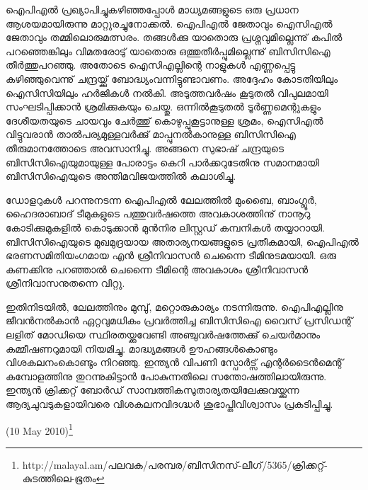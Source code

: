 

ഐപിഎല്‍ പ്രഖ്യാപിച്ചുകഴിഞ്ഞപ്പോള്‍ മാധ്യമങ്ങളുടെ ഒരു പ്രധാന ആശയമായിരുന്നു മാറ്റുരച്ചുനോക്കല്‍. ഐപിഎല്‍ 
ജേതാവും ഐസിഎല്‍ ജേതാവും തമ്മിലൊരുമത്സരം. തങ്ങള്‍ക്കു യാതൊരു പ്രശ്നവുമില്ലെന്നു് കപില്‍ പറഞ്ഞെങ്കിലും 
വിമതരോടു് യാതൊരു ഒത്തുതീര്‍പ്പുമില്ലെന്നു് ബിസിസിഐ തീര്‍ത്തുപറഞ്ഞു. അതോടെ ഐസിഎല്ലിന്റെ നാളുകള്‍ 
എണ്ണപ്പെട്ടു കഴിഞ്ഞുവെന്നു് ചന്ദ്രയ്ക്കു് ബോദ്ധ്യംവന്നിട്ടുണ്ടാവണം. അദ്ദേഹം കോടതിയിലും ഐസിസിയിലും ഹര്‍ജികള്‍ 
നല്‍കി. അടുത്തവര്‍ഷം കൂടുതല്‍ വിപുലമായി സംഘടിപ്പിക്കാന്‍ ശ്രമിക്കുകയും ചെയ്തു. ഒന്നില്‍കൂടുതല്‍ ടൂര്‍ണ്ണമെന്റുകളും 
ദേശീയതയുടെ ചായവും ചേര്‍ത്തു് കൊഴുപ്പുകൂട്ടാനുള്ള ശ്രമം, ഐസിഎല്‍ വിട്ടുവരാന്‍ താല്‍പര്യമുള്ളവര്‍ക്കു് മാപ്പുനല്‍കാനുള്ള 
ബിസിസിഐ തീരുമാനത്തോടെ അവസാനിച്ചു. അങ്ങനെ സുഭാഷ് ചന്ദ്രയുടെ ബിസിസിഐയുമായുള്ള 
പോരാട്ടം കെറി പാര്‍ക്കറുടേതിനു സമാനമായി ബിസിസിഐയുടെ അന്തിമവിജയത്തില്‍ കലാശിച്ചു.

ഡോളറുകള്‍ പറന്നുനടന്ന ഐപിഎല്‍ ലേലത്തില്‍ മുംബൈ, ബാംഗ്ലൂര്‍, ഹൈദരാബാദ് ടീമുകളുടെ പത്തുവര്‍ഷത്തെ 
അവകാശത്തിനു് നാനൂറു കോടിക്കുമുകളില്‍ കൊടുക്കാന്‍ മുന്‍നിര ലിസ്റ്റഡ് കമ്പനികള്‍ തയ്യാറായി. ബിസിസിഐയുടെ 
മുഖമുദ്രയായ അതാര്യനയങ്ങളുടെ പ്രതീകമായി, ഐപിഎല്‍ ഭരണസമിതിയംഗമായ എന്‍ ശ്രീനിവാസന്‍ ചെന്നൈ 
ടീമിനുടമയായി. ഒരു കണക്കിനു പറഞ്ഞാല്‍ ചെന്നൈ ടീമിന്റെ അവകാശം ശ്രീനിവാസന്‍ ശ്രീനിവാസനുതന്നെ വിറ്റു.

ഇതിനിടയില്‍, ലേലത്തിനും മുമ്പു്, മറ്റൊരുകാര്യം നടന്നിരുന്നു. ഐപിഎല്ലിനു ജീവന്‍നല്‍കാന്‍ ഏറ്റവുമധികം പ്രവര്‍ത്തിച്ച 
ബിസിസിഐ വൈസ് പ്രസിഡന്റ് ലളിത് മോഡിയെ സ്ഥിരതയ്ക്കുവേണ്ടി അഞ്ചുവര്‍ഷത്തേക്കു് ചെയര്‍മാനും കമ്മീഷണറുമായി 
നിയമിച്ചു. മാദ്ധ്യമങ്ങള്‍ ഊഹങ്ങള്‍കൊണ്ടും വിശകലനംകൊണ്ടും നിറഞ്ഞു. ഇന്ത്യന്‍ വിപണി സ്പോര്‍ട്സ് 
എന്റര്‍ടൈന്‍മെന്റ് കമ്പോളത്തിനു തുറന്നുകിട്ടാന്‍ പോകുന്നതിലെ സന്തോഷത്തിലായിരുന്നു. ഇന്ത്യന്‍ ക്രിക്കറ്റ് ബോര്‍ഡ് 
സാമ്പത്തികസുതാര്യതയിലേക്കുവയ്ക്കുന്ന ആദ്യചുവടുകളായിവരെ വിശകലനവിദഗ്ദ്ധര്‍ ശുഭാപ്തിവിശ്വാസം പ്രകടിപ്പിച്ചു.

(10 May 2010)\footnote{http://malayal.am/പലവക/പരമ്പര/ബിസിനസ്-ലീഗ്/5365/ക്രിക്കറ്റ്-കുടത്തിലെ-ഭൂതം}

\newpage
